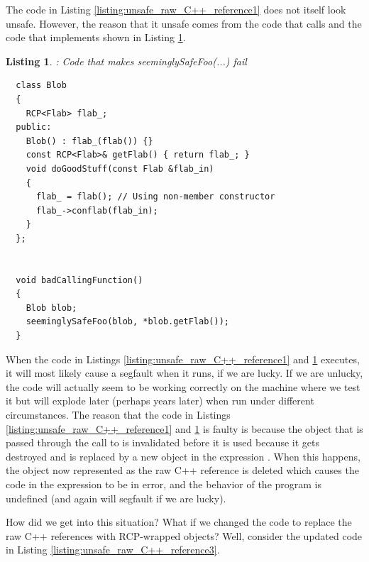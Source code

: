 \documentclass[pdf,ps2pdf,11pt]{SANDreport}
\newtheorem{listing}{Listing}
\begin{document}
The code in Listing {}\ref{listing:unsafe_raw_C++_reference1} does not
itself look unsafe.  However, the reason that it unsafe comes from the
code that calls {} and the code that
implements {} shown in Listing
{}\ref{listing:unsafe_raw_C++_reference2}.

\begin{listing}: Code that makes seeminglySafeFoo(...) fail\\
\label{listing:unsafe_raw_C++_reference2}
{\small\begin{verbatim}
  class Blob
  {
    RCP<Flab> flab_;
  public:
    Blob() : flab_(flab()) {}
    const RCP<Flab>& getFlab() { return flab_; }
    void doGoodStuff(const Flab &flab_in)
    {
      flab_ = flab(); // Using non-member constructor
      flab_->conflab(flab_in);
    }
  };


  void badCallingFunction()
  {
    Blob blob;
    seeminglySafeFoo(blob, *blob.getFlab());
  }
\end{verbatim}}
\end{listing}

When the code in Listings {}\ref{listing:unsafe_raw_C++_reference1}
and {}\ref{listing:unsafe_raw_C++_reference2} executes, it will most
likely cause a segfault when it runs, if we are lucky.  If we are
unlucky, the code will actually seem to be working correctly on the
machine where we test it but will explode later (perhaps years later)
when run under different circumstances.  The reason that the code in
Listings {}\ref{listing:unsafe_raw_C++_reference1} and
{}\ref{listing:unsafe_raw_C++_reference2} is faulty is because the
{} object that is passed through the call
{} to
{} is invalidated before it is used
because it gets destroyed and is replaced by a new object in the
expression {}.  When this happens, the object
now represented as the raw C++ reference {} is
deleted which causes the code in the expression
{} to be in error, and the behavior
of the program is undefined (and again will segfault if we are lucky).

How did we get into this situation?  What if we changed the code to
replace the raw C++ references with RCP-wrapped objects?  Well,
consider the updated code in Listing
{}\ref{listing:unsafe_raw_C++_reference3}.
\end{document}
